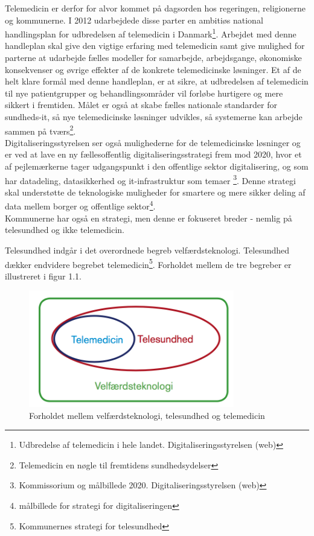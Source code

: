 Telemedicin er derfor for alvor kommet på dagsorden hos regeringen, religionerne og kommunerne. I 2012 udarbejdede disse parter en ambitiøs national handlingsplan for udbredelsen af telemedicin i Danmark\footnote{Udbredelse af telemedicin i hele landet. Digitaliseringsstyrelsen (web)}. Arbejdet med denne handleplan skal give den vigtige erfaring med telemedicin samt give mulighed for parterne at udarbejde fælles modeller for samarbejde, arbejdsgange, økonomiske konsekvenser og øvrige effekter af de konkrete telemedicinske løsninger. Et af de helt klare formål med denne handleplan, er at sikre, at udbredelsen af telemedicin til nye patientgrupper og behandlingsområder vil forløbe hurtigere og mere sikkert i fremtiden. Målet er også at skabe fælles nationale standarder for sundheds-it, så nye telemedicinske løsninger udvikles, så systemerne kan arbejde sammen på tværs\footnote{Telemedicin en nøgle til fremtidens sundhedsydelser}. \\
Digitaliseringsstyrelsen ser også mulighederne for de telemedicinske løsninger og er ved at lave en ny fællesoffentlig digitaliseringsstrategi frem mod 2020, hvor et af pejlemærkerne tager udgangspunkt i den offentlige sektor digitalisering, og som har datadeling, datasikkerhed og it-infrastruktur som temaer \footnote{Kommissorium og målbillede 2020. Digitaliseringsstyrelsen (web)}. Denne strategi skal understøtte de teknologiske muligheder for smartere og mere sikker deling af data mellem borger og offentlige sektor\footnote{målbillede for strategi for digitaliseringen}.\\
Kommunerne har også en strategi, men denne er fokuseret breder - nemlig på telesundhed og ikke telemedicin.

Telesundhed indgår i det overordnede begreb velfærdsteknologi. Telesundhed dækker endvidere begrebet telemedicin\footnote{Kommunernes strategi for telesundhed}. Forholdet mellem de tre begreber er illustreret i figur 1.1. 

\begin{figure}[H]
	\centering
	\includegraphics[width=0.8\textwidth]{Figurer/Snip20160426_6}
	\caption{Forholdet mellem velfærdsteknologi, telesundhed og telemedicin \protect\footnotemark}
\end{figure}

